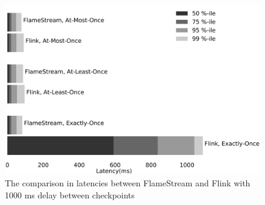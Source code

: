 \begin{figure}[htbp]
  \centering
  \includegraphics[width=.5\textwidth]{pics/comparison1000}
  \caption{The comparison in latencies between FlameStream and Flink with 1000 ms delay between checkpoints}
  \label {comparison1000}
\end{figure}
